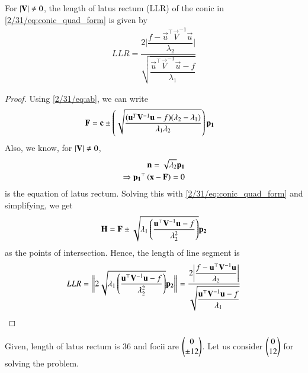 \begin{theorem}
For $\left\vert\mathbf{V}\right\vert \ne 0$, the length of latus rectum (LLR) of the conic in \eqref{2/31/eq:conic_quad_form} is given by 
\begin{align} 
LLR=\dfrac{2\bigg | \dfrac{f-\vec{u}^{\top}\vec{V}^{-1}\vec{u}}{\lambda_2}\bigg | }{{\sqrt{\dfrac{\vec{u}^{\top}\vec{V}^{-1}\vec{u} -f}{\lambda_1}}}}
\label{2/31/eq:LLR}
\end{align} 
\end{theorem}
\begin{proof}
Using \eqref{2/31/eq:ab}, we can write
\begin{align}
  \mathbf{F} &=\mathbf{c}\pm\left(\sqrt{\frac{(\mathbf{u}^T\mathbf{V}^{-1}\mathbf{u}-f)(\lambda_2-\lambda_1)}{\lambda_1\lambda_2}}\right)\mathbf{p_1} \label{2/31/eq:foci}
\end{align}
Also, we know, for $\left\vert\mathbf{V}\right\vert \ne 0$,
\begin{align}
    \mathbf{n}=\sqrt{\lambda_2}\mathbf{p_1} \label{2/31/eq:conv}\\
    \Rightarrow \mathbf{p_1}^{\top}\left(\mathbf{x}-\mathbf{F}\right) = 0
\end{align}
is the equation of latus rectum. Solving this with \eqref{2/31/eq:conic_quad_form} and simplifying, we get 
\begin{align}
    \mathbf{H}=\mathbf{F}\pm\sqrt{\lambda_1\left( \dfrac{\mathbf{u}^{\top}\mathbf{V}^{-1}\mathbf{u} -f}{\lambda_2^2}\right)} \mathbf{p_2}
\end{align}
as the points of intersection. Hence, the length of line segment is
\begin{align}
    LLR=\bigg |\bigg |2\sqrt{\lambda_1\left( \dfrac{\mathbf{u}^{\top}\mathbf{V}^{-1}\mathbf{u} -f}{\lambda_2^2}\right)} \mathbf{p_2}\bigg |\bigg |=\dfrac{2\bigg | \dfrac{f-\mathbf{u}^{\top}\mathbf{V}^{-1}\mathbf{u}}{\lambda_2}\bigg | }{{\sqrt{\dfrac{\mathbf{u}^{\top}\mathbf{V}^{-1}\mathbf{u} -f}{\lambda_1}}}}
\end{align}
\end{proof}
Given, length of latus rectum is 36 and focii are $\begin{pmatrix}0\\ \pm12\end{pmatrix}$. Let us consider $\begin{pmatrix}0\\ 12\end{pmatrix}$ for solving the problem.
